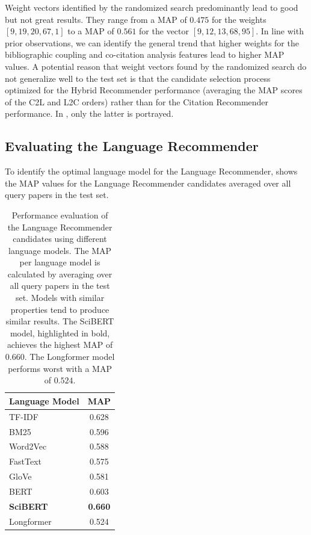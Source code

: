 Weight vectors identified by the randomized search predominantly lead to good but not great results. They range from a \ac{MAP} of $0.475$ for the weights $[9, 19, 20, 67, 1]$ to a \ac{MAP} of $0.561$ for the vector $[9, 12, 13, 68, 95]$.
In line with prior observations, we can identify the general trend that higher weights for the bibliographic coupling and co-citation analysis features lead to higher \ac{MAP} values.
A potential reason that weight vectors found by the randomized search do not generalize well to the test set is that the candidate selection process optimized for the Hybrid Recommender performance (averaging the \ac{MAP} scores of the \ac{C2L} and \ac{L2C} orders) rather than for the Citation Recommender performance.
In , only the latter is portrayed.


\subsection{Evaluating the Language Recommender} \label{sec:evaluation-language-recommender}

To identify the optimal language model for the Language Recommender,  shows the \ac{MAP} values for the Language Recommender candidates averaged over all query papers in the test set.

\begin{table}[htb!]
    \centering
    \begin{tabular}{lc}
        \toprule
        \textbf{Language Model} & \textbf{MAP}   \\
        \midrule
        TF-IDF                  & 0.628          \\
        BM25                    & 0.596          \\
        Word2Vec                & 0.588          \\
        FastText                & 0.575          \\
        GloVe                   & 0.581          \\
        BERT                    & 0.603          \\
        \textbf{SciBERT}        & \textbf{0.660} \\
        Longformer              & 0.524          \\
        \bottomrule
    \end{tabular}
    \caption[Evaluation of the Language Recommender]{Performance evaluation of the Language Recommender candidates using different language models. The \ac{MAP} per language model is calculated by averaging over all query papers in the test set. Models with similar properties tend to produce similar results. The SciBERT model, highlighted in bold, achieves the highest \ac{MAP} of $0.660$. The Longformer model performs worst with a \ac{MAP} of $0.524$.}
    \label{tab:language-recommender-evaluation}
\end{table}


